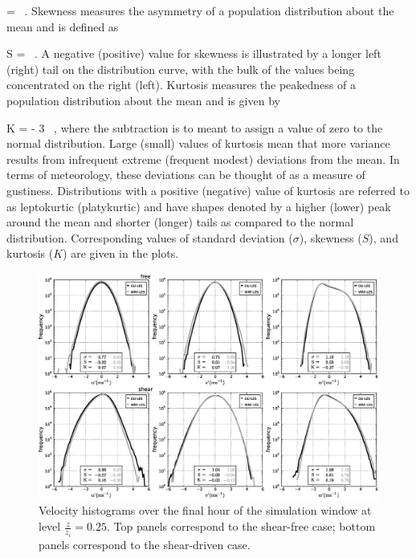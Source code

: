 \be
\sigma =  \mbox{ .}
\label{stddev}
\ee
\noindent Skewness measures the asymmetry of a population distribution about the mean and is defined as


\be
S =  \mbox{ .}
\label{skewness}
\ee
\noindent A negative (positive) value for skewness is illustrated by a longer left (right) tail on the distribution curve, with the bulk of the values being concentrated on the right (left). Kurtosis measures the peakedness of a population distribution about the mean and is given by 


\be
K =  - 3 \mbox{ ,}
\label{skewness}
\ee
\noindent where the subtraction is to meant to assign a value of zero to the normal distribution. Large (small) values of kurtosis mean that more variance results from infrequent extreme (frequent modest) deviations from the mean. In terms of meteorology, these deviations can be thought of as a measure of gustiness. Distributions with a positive (negative) value of kurtosis are referred to as leptokurtic (platykurtic) and have shapes denoted by a higher (lower) peak around the mean and shorter (longer) tails as compared to the normal distribution. Corresponding values of standard deviation ($\sigma$), skewness ($S$), and kurtosis ($K$) are given in the plots.


\begin{figure}[!ht]
\begin{center}
\includegraphics[width=\textwidth]{figures/chapter5/velocity_distribution}
\end{center}
\caption{Velocity histograms over the final hour of the simulation window at level $\frac{z}{z_i}=0.25$. Top panels correspond to the shear-free case; bottom panels correspond to the shear-driven case.}
\label{figure508}
\end{figure}


